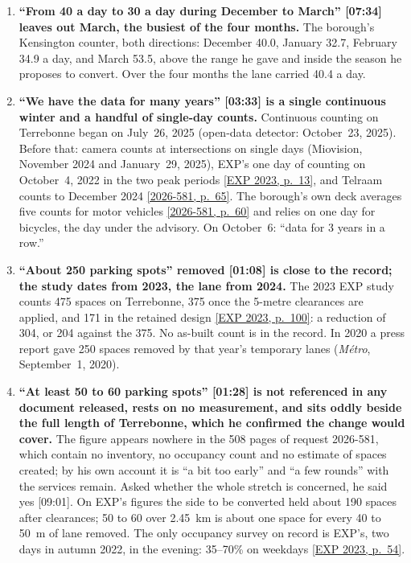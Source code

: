 \documentclass[11pt,letterpaper]{article}
\newcommand{\repourl}{https://github.com/OpenMobilityData/Terrebonne-open-sources}
\newcommand{\pagesurl}{https://openmobilitydata.github.io/Terrebonne-access-requests}
\newcommand{\cliptime}[1]{\textsf{\small[#1]}}
\newcommand{\pgl}[2]{\href{\pagesurl/2026-581/raw/01_emails_mandate_counts.pdf\#page=#1}{\textsf{\small[2026-581, p.~#2]}}}
\newcommand{\pg}[1]{\pgl{#1}{#1}}
\newcommand{\exppg}[1]{\href{\repourl/blob/main/2023-exp-mobility-study/raw/EXP_Etude_de_mobilite_rue_de_Terrebonne_2023.pdf}{\textsf{\small[EXP 2023, p.~#1]}}}
\begin{document}
\begin{enumerate}[nosep]
  \item \begin{minipage}[t]{\linewidth}\textbf{``From 40 a day to 30 a day during December to March'' \cliptime{07:34} leaves out March, the busiest of the four months.} The borough's Kensington counter, both directions: December 40.0, January 32.7, February 34.9 a day, and March 53.5, above the range he gave and inside the season he proposes to convert. Over the four months the lane carried 40.4 a day.\end{minipage}\vspace{0.35em}
  \item \begin{minipage}[t]{\linewidth}\textbf{``We have the data for many years'' \cliptime{03:33} is a single continuous winter and a handful of single-day counts.} Continuous counting on Terrebonne began on July~26, 2025 (open-data detector: October~23, 2025). Before that: camera counts at intersections on single days (Miovision, November 2024 and January~29, 2025), EXP's one day of counting on October~4, 2022 in the two peak periods \exppg{13}, and Telraam counts to December 2024 \pg{65}. The borough's own deck averages five counts for motor vehicles \pg{60} and relies on one day for bicycles, the day under the advisory. On October~6: ``data for 3 years in a row.''\end{minipage}\vspace{0.35em}
  \item \begin{minipage}[t]{\linewidth}\textbf{``About 250 parking spots'' removed \cliptime{01:08} is close to the record; the study dates from 2023, the lane from 2024.} The 2023 EXP study counts 475 spaces on Terrebonne, 375 once the 5-metre clearances are applied, and 171 in the retained design \exppg{100}: a reduction of 304, or 204 against the 375. No as-built count is in the record. In 2020 a press report gave 250 spaces removed by that year's temporary lanes (\emph{Métro}, September~1, 2020).\end{minipage}\vspace{0.35em}
  \item \begin{minipage}[t]{\linewidth}\textbf{``At least 50 to 60 parking spots'' \cliptime{01:28} is not referenced in any document released, rests on no measurement, and sits oddly beside the full length of Terrebonne, which he confirmed the change would cover.} The figure appears nowhere in the 508 pages of request 2026-581, which contain no inventory, no occupancy count and no estimate of spaces created; by his own account it is ``a bit too early'' and ``a few rounds'' with the services remain. Asked whether the whole stretch is concerned, he said yes \cliptime{09:01}. On EXP's figures the side to be converted held about 190 spaces after clearances; 50 to 60 over 2.45~km is about one space for every 40 to 50~m of lane removed. The only occupancy survey on record is EXP's, two days in autumn 2022, in the evening: 35--70\% on weekdays \exppg{54}.\end{minipage}\vspace{0.35em}

\end{enumerate}
\end{document}
